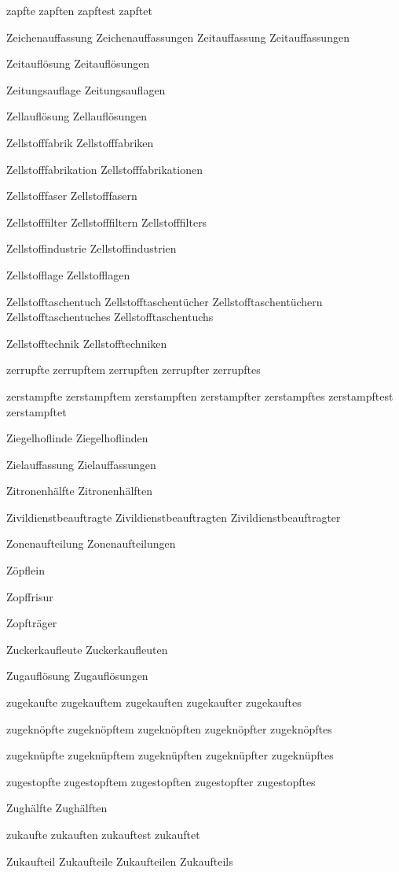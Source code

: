 zapfte
zapften
zapftest
zapftet

Zeichenauffassung
Zeichenauffassungen
Zeitauffassung
Zeitauffassungen

Zeitauflösung
Zeitauflösungen

Zeitungsauflage
Zeitungsauflagen

Zellauflösung
Zellauflösungen

Zellstofffabrik
Zellstofffabriken

Zellstofffabrikation
Zellstofffabrikationen

Zellstofffaser
Zellstofffasern

Zellstofffilter
Zellstofffiltern
Zellstofffilters

Zellstoffindustrie
Zellstoffindustrien

Zellstofflage
Zellstofflagen

Zellstofftaschentuch
Zellstofftaschentücher
Zellstofftaschentüchern
Zellstofftaschentuches
Zellstofftaschentuchs

Zellstofftechnik
Zellstofftechniken

zerrupfte
zerrupftem
zerrupften
zerrupfter
zerrupftes

zerstampfte
zerstampftem
zerstampften
zerstampfter
zerstampftes
zerstampftest
zerstampftet

Ziegelhoflinde
Ziegelhoflinden

Zielauffassung
Zielauffassungen

Zitronenhälfte
Zitronenhälften

Zivildienstbeauftragte
Zivildienstbeauftragten
Zivildienstbeauftragter

Zonenaufteilung
Zonenaufteilungen

Zöpflein

Zopffrisur

Zopfträger

Zuckerkaufleute
Zuckerkaufleuten

Zugauflösung
Zugauflösungen

zugekaufte
zugekauftem
zugekauften
zugekaufter
zugekauftes

zugeknöpfte
zugeknöpftem
zugeknöpften
zugeknöpfter
zugeknöpftes

zugeknüpfte
zugeknüpftem
zugeknüpften
zugeknüpfter
zugeknüpftes

zugestopfte
zugestopftem
zugestopften
zugestopfter
zugestopftes

Zughälfte
Zughälften

zukaufte
zukauften
zukauftest
zukauftet

Zukaufteil
Zukaufteile
Zukaufteilen
Zukaufteils

